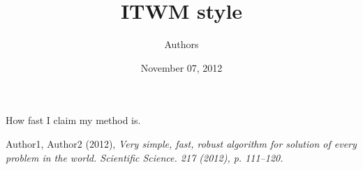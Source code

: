 \documentclass{beamer}
\begin{document}
 
  \title{ ITWM style }
  \author{Authors}
  \date{November 07, 2012}
\begin{frame}
  \titlepage
\end{frame} 


\begin{frame}{How fast I claim my method is.}

{ \smaller[0.1] %
 \begin{thebibliography}{10}
\beamertemplatebookbibitems
{}
{\sc Author1, Author2 (2012)}, {\em Very simple, fast, robust algorithm for solution of every problem in the world. Scientific Science. 217 (2012), p. 111--120.}
\end{thebibliography}
}

\end{frame}
\end{document}
